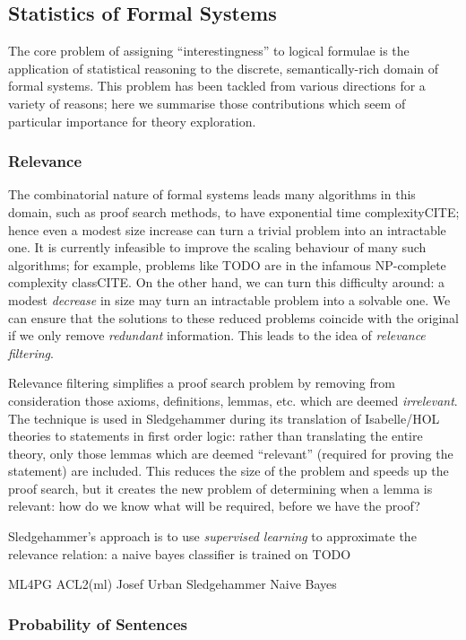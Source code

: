 \documentclass[]{article}
\begin{document}
\subsection{Statistics of Formal Systems}

The core problem of assigning ``interestingness'' to logical formulae is the application of statistical reasoning to the discrete, semantically-rich domain of formal systems. This problem has been tackled from various directions for a variety of reasons; here we summarise those contributions which seem of particular importance for theory exploration.

\subsubsection{Relevance}

The combinatorial nature of formal systems leads many algorithms in this domain, such as proof search methods, to have exponential time complexityCITE; hence even a modest size increase can turn a trivial problem into an intractable one. It is currently infeasible to improve the scaling behaviour of many such algorithms; for example, problems like TODO are in the infamous NP-complete complexity classCITE. On the other hand, we can turn this difficulty around: a modest \emph{decrease} in size may turn an intractable problem into a solvable one. We can ensure that the solutions to these reduced problems coincide with the original if we only remove \emph{redundant} information. This leads to the idea of \emph{relevance filtering}.

Relevance filtering simplifies a proof search problem by removing from consideration those axioms, definitions, lemmas, etc. which are deemed \emph{irrelevant}. The technique is used in Sledgehammer during its translation of Isabelle/HOL theories to statements in first order logic: rather than translating the entire theory, only those lemmas which are deemed ``relevant'' (required for proving the statement) are included. This reduces the size of the problem and speeds up the proof search, but it creates the new problem of determining when a lemma is relevant: how do we know what will be required, before we have the proof?

Sledgehammer's approach is to use \emph{supervised learning} to approximate the relevance relation: a naive bayes classifier is trained on TODO

ML4PG
ACL2(ml)
Josef Urban
Sledgehammer
Naive Bayes

\subsubsection{Probability of Sentences}
\end{document}

